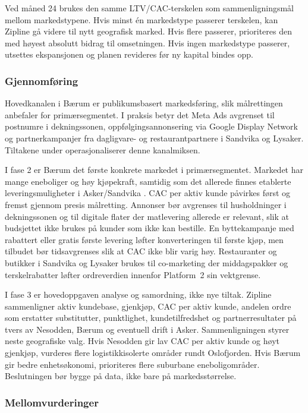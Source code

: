 Ved måned 24 brukes den samme LTV/CAC-terskelen som
sammenligningsmål mellom markedstypene. Hvis minst én markedstype
passerer terskelen, kan Zipline gå videre til nytt geografisk marked.
Hvis flere passerer, prioriteres den med høyest absolutt bidrag til
omsetningen. Hvis ingen markedstype passerer, utsettes ekspansjonen
og planen revideres før ny kapital bindes opp.

\subsubsection{Gjennomføring}

Hovedkanalen i Bærum er publikumsbasert markedsføring, slik
målrettingen anbefaler for primærsegmentet. I praksis betyr det Meta
Ads avgrenset til postnumre i dekningssonen, oppfølgings\-annonsering
via Google Display Network og partnerkampanjer fra dagligvare- og
restaurantpartnere i Sandvika og Lysaker. Tiltakene under
operasjonaliserer denne kanalmiksen.

I fase 2 er Bærum det første konkrete markedet i primærsegmentet.
Markedet har mange eneboliger og høy kjøpekraft, samtidig som det
allerede finnes etablerte leveringsmuligheter i Asker/Sandvika
\parencite{ssb_kommunefakta_baerum, omholt2023_ssb,
wolt2026_asker_sandvika}. CAC per aktiv kunde påvirkes først og fremst
gjennom presis målretting. Annonser bør avgrenses til husholdninger i
dekningssonen og til digitale flater der matlevering allerede er
relevant, slik at budsjettet ikke brukes på kunder som ikke kan
bestille. En byttekampanje med rabattert eller gratis første levering
løfter konverteringen til første kjøp, men tilbudet bør tidsavgrenses
slik at CAC ikke blir varig høy. Restauranter og butikker i Sandvika og
Lysaker brukes til co-marketing der middagspakker og terskelrabatter
løfter ordreverdien innenfor Platform~2 sin vektgrense.

I fase 3 er hovedoppgaven analyse og samordning, ikke nye tiltak.
Zipline sammenligner aktiv kundebase, gjenkjøp, CAC per aktiv kunde,
andelen ordre som erstatter substitutter, punktlighet, kundetilfredshet
og partnerresultater på tvers av Nesodden, Bærum og eventuell drift i
Asker. Sammenligningen styrer neste geografiske valg. Hvis Nesodden
gir lav CAC per aktiv kunde og høyt gjenkjøp, vurderes flere
logistikkisolerte områder rundt Oslofjorden. Hvis Bærum gir bedre
enhetsøkonomi, prioriteres flere suburbane eneboligområder. Beslutningen
bør bygge på data, ikke bare på markedsstørrelse.

\subsubsection{Mellomvurderinger}

